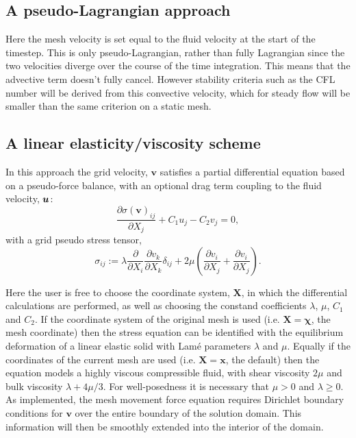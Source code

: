 \subsection{A pseudo-Lagrangian approach}

Here the mesh velocity is set equal to the fluid velocity at the start of the timestep. This is only pseudo-Lagrangian, rather than fully Lagrangian since the two velocities diverge over the course of the time integration. This means that the advective term doesn't fully cancel. However stability criteria such as the CFL number will be derived from this convective velocity, which for steady flow will be smaller than the same criterion on a static mesh.



\subsection{A linear elasticity/viscosity scheme}

In this approach \citep{alauzet2014changing} the grid velocity, $\bm{v}$ satisfies a partial differential equation based on a pseudo-force balance, with an optional drag term coupling to the fluid velocity, ${\mbox{\boldmath$u$}}$:
\[\frac{\partial \sigma(\bm{v})_{ij}}{\partial X_j} + C_1 u_j  -C_2 v_j = 0,\]
with a grid pseudo stress tensor,
\[ \sigma_{ij} := \lambda \frac{\partial}{\partial X_i}\frac{\partial v_k}{\partial X_k}\delta_{ij} + 2 \mu \left(\frac{\partial v_i}{\partial X_j} + \frac{\partial v_i}{\partial X_j}\right).\]

Here the user is free to choose the coordinate system, $\bm{X}$, in which the differential calculations are performed, as well as choosing the constand coefficients $\lambda$, $\mu$, $C_1$ and $C_2$. If the coordinate system of the original mesh is used (i.e. $\bm{X}=\bm{\chi}$, the mesh coordinate) then the stress equation can be identified with the equilibrium deformation of a linear elastic solid with Lamé parameters $\lambda$ and $\mu$. Equally if the coordinates of the current mesh are used (i.e. $\bm{X}=\bm{x}$, the \fluidity default) then the equation models a highly viscous compressible fluid, with shear viscosity $2\mu$ and bulk viscosity $\lambda +4\mu/3$. For well-posedness it is necessary that $\mu>0$ and $\lambda\geq0$. As implemented, the mesh movement force equation requires Dirichlet boundary conditions for $\bm{v}$ over the entire boundary of the solution domain. This information will then be smoothly extended into the interior of the domain.


